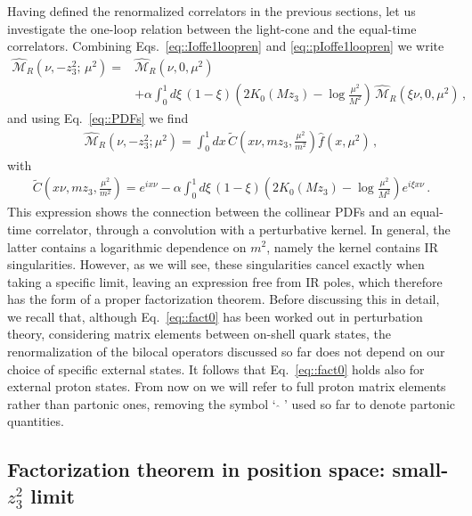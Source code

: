 Having defined the renormalized correlators in the previous sections, let us
investigate the one-loop relation between the light-cone and the equal-time
correlators. Combining Eqs.~\eqref{eq::Ioffe1loopren} and
\eqref{eq::pIoffe1loopren} we write
\begin{align}
	\label{eq::fact00}
	\widehat{\mathcal{M}}_R\left(\nu,-z_3^2;\,\mu^2\right) = 
	& {} \widehat{\mathcal{M}}_R\left(\nu,0,\mu^2\right) \nonumber \\
	& + \alpha\int_0^1 d\xi \, 
	\left(1-\xi\right) \left(2K_0\left(M z_3\right)
	-\log\frac{\mu^2}{M^2}\right)\, 
	\widehat{\mathcal{M}}_R\left(\xi\nu,0,\mu^2\right)\, ,
\end{align}
and using Eq.~\eqref{eq::PDFs} we find
\begin{align}
	\label{eq::fact0}
	\widehat{\mathcal{M}}_R\left(\nu, -z_3^2; \mu^2\right) = 
	\int_{0}^{1} dx\,\tilde{C}\left(x\nu, m z_3, \frac{\mu^2}{m^2} \right) \widehat{f}\left(x,\mu^2\right)\, ,
\end{align}
with
\begin{align}
	\tilde{C}\left(x\nu, m z_3, \frac{\mu^2}{m^2} \right) = 
	e^{i x\nu} - \alpha\int_0^1 d\xi \, \left(1-\xi\right)
	\left(2K_0\left(M z_3\right)-\log\frac{\mu^2}{M^2}\right) e^{i \xi x\nu}\, .
\end{align}
This expression shows the connection between the collinear PDFs and an
equal-time correlator, through a convolution with a perturbative kernel. In
general, the latter contains a logarithmic dependence on $m^2$, namely the
kernel contains IR singularities. However, as we will see, these
singularities cancel exactly when taking a specific limit, leaving an expression
free from IR poles, which therefore has   the form of a proper factorization
theorem.
%
Before discussing this in detail, we recall that, although Eq.~\eqref{eq::fact0}
has been worked out in perturbation theory, considering matrix elements between
on-shell quark states, the renormalization of the bilocal operators discussed so
far does not depend on our choice of specific external states. It follows that
Eq.~\eqref{eq::fact0} holds also for external proton states. From now on we will
refer to full proton matrix elements rather than partonic ones, removing the
symbol `$\,\,\widehat{}\,\,$' used so far to denote partonic quantities.


\subsection{Factorization theorem in position space: small-$z_3^2$ limit}
\label{sec:pseudo_PDFsfact}

